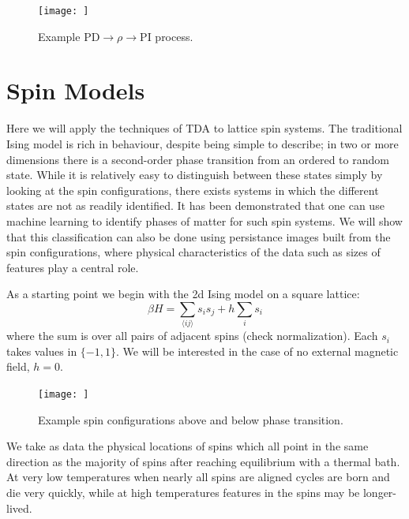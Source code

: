 \documentclass[11pt]{article}
\begin{document}
\begin{figure}[b]
    \centering
    \texttt{[image: ]}
    \caption{Example PD$\rightarrow\rho\rightarrow$PI process.}
\end{figure}



\section{Spin Models}
Here we will apply the techniques of TDA to lattice spin systems. The traditional Ising model is rich in behaviour, despite being simple to describe; in two or more dimensions there is a second-order phase transition from an ordered to random state. While it is relatively easy to distinguish between these states simply by looking at the spin configurations, there exists systems in which the different states are not as readily identified. It has been demonstrated that one can use machine learning to identify phases of matter for such spin systems. We will show that this classification can also be done using persistance images built from the spin configurations, where physical characteristics of the data such as sizes of features play a central role.

As a starting point we begin with the 2d Ising model on a square lattice:
\begin{equation}
    \beta H = \sum_{\langle ij\rangle}s_is_j + h\sum_is_i
\end{equation}
where the sum is over all pairs of adjacent spins (check normalization). Each $s_i$ takes values in $\{-1,1\}$. We will be interested in the case of no external magnetic field, $h=0$.

\begin{figure}[t]
    \centering
    \texttt{[image: ]}
    \caption{Example spin configurations above and below phase transition.}
\end{figure}

We take as data the physical locations of spins which all point in the same direction as the majority of spins after reaching equilibrium with a thermal bath. At very low temperatures when nearly all spins are aligned cycles are born and die very quickly, while at high temperatures features in the spins may be longer-lived.
\end{document}
